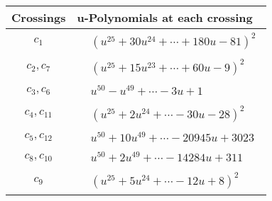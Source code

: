 \documentclass[1p]{elsarticle_modified}
\theoremstyle{definition}
\begin{document}
\begin{tabular}{m{50pt}|m{274pt}}
Crossings & \hspace{64pt}u-Polynomials at each crossing \\
\hline $$\begin{aligned}c_{1}\end{aligned}$$&$\begin{aligned}
&(u^{25}+30 u^{24}+\cdots+180 u-81)^{2}
\end{aligned}$\\
\hline $$\begin{aligned}c_{2},c_{7}\end{aligned}$$&$\begin{aligned}
&(u^{25}+15 u^{23}+\cdots+60 u-9)^{2}
\end{aligned}$\\
\hline $$\begin{aligned}c_{3},c_{6}\end{aligned}$$&$\begin{aligned}
&u^{50}- u^{49}+\cdots-3 u+1
\end{aligned}$\\
\hline $$\begin{aligned}c_{4},c_{11}\end{aligned}$$&$\begin{aligned}
&(u^{25}+2 u^{24}+\cdots-30 u-28)^{2}
\end{aligned}$\\
\hline $$\begin{aligned}c_{5},c_{12}\end{aligned}$$&$\begin{aligned}
&u^{50}+10 u^{49}+\cdots-20945 u+3023
\end{aligned}$\\
\hline $$\begin{aligned}c_{8},c_{10}\end{aligned}$$&$\begin{aligned}
&u^{50}+2 u^{49}+\cdots-14284 u+311
\end{aligned}$\\
\hline $$\begin{aligned}c_{9}\end{aligned}$$&$\begin{aligned}
&(u^{25}+5 u^{24}+\cdots-12 u+8)^{2}
\end{aligned}$\\
\hline
\end{tabular}\\~\\
\end{document}
